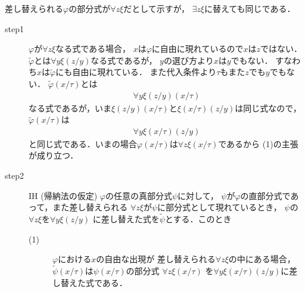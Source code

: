 	\begin{metaprf} 差し替えられる$\varphi$の部分式が$\forall z \xi$だとして示すが，
		$\exists z \xi$に替えても同じである．
		\begin{description}
			\item[step1] $\varphi$が$\forall z \xi$なる式である場合，
				$x$は$\varphi$に自由に現れているので$x$は$z$ではない．
				$\widetilde{\varphi}$とは$\forall y \xi(z/y)$なる式であるが，
				$y$の選び方より$x$は$y$でもない．
				すなわち$x$は$\widetilde{\varphi}$にも自由に現れている．
				また代入条件より$\tau$もまた$z$でも$y$でもない．
				$\widetilde{\varphi}(x/\tau)$とは
				\begin{align}
					\forall y \xi(z/y)(x/\tau)
				\end{align}
				なる式であるが，いま$\xi(z/y)(x/\tau)$と$\xi(x/\tau)(z/y)$は同じ式なので，
				$\widetilde{\varphi}(x/\tau)$は
				\begin{align}
					\forall y \xi(x/\tau)(z/y)
				\end{align}
				と同じ式である．いまの場合$\varphi(x/\tau)$は$\forall z \xi(x/\tau)$であるから
				(1)の主張が成り立つ．
				
			\item[step2]\mbox{}
				\begin{itembox}[l]{IH (帰納法の仮定)}
					$\varphi$の任意の真部分式$\psi$に対して，
					$\psi$が$\varphi$の直部分式であって，また差し替えられる
					$\forall z \xi$が$\psi$に部分式として現れているとき，
					$\psi$の$\forall z \xi$を$\forall y \xi(z/y)$ 
					に差し替えた式を$\widetilde{\psi}$とする．このとき
					\begin{description}
						\item[(1)] $\varphi$における$x$の自由な出現が
							差し替えられる$\forall z \xi$の中にある場合，
							$\widetilde{\psi}(x/\tau)$は$\psi(x/\tau)$の部分式
							$\forall z \xi(x/\tau)$ 
							を$\forall y \xi(x/\tau)(z/y)$に差し替えた式である．
						

\end{description}
\end{itembox}
\end{description}
\end{metaprf}
